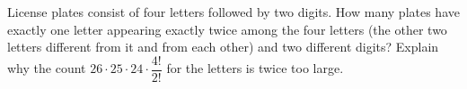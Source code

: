 License plates consist of four letters followed by two digits. How many plates have exactly one letter appearing exactly twice among the four letters (the other two letters different from it and from each other) and two different digits? Explain why the count $26\cdot25\cdot24\cdot\dfrac{4!}{2!}$ for the letters is twice too large.
